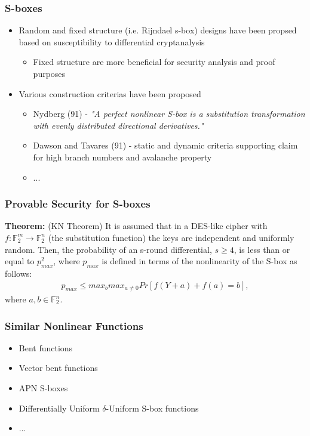 \documentclass[handout]{beamer}
\newcommand{\field}[1]{\mathbb{#1}} %
\begin{document}
\begin{frame}
	\frametitle{S-boxes}
	\begin{itemize}
		\item Random and fixed structure (i.e. Rijndael s-box) designs have been propsed based on susceptibility to differential cryptanalysis
		\begin{itemize}
			\item Fixed structure are more beneficial for security analysis and proof purposes
		\end{itemize}
		\item Various construction criterias have been proposed
		\begin{itemize}
			\item Nydberg (91) - \emph{"A perfect nonlinear S-box is a substitution transformation with evenly distributed directional derivatives."}
			\item Dawson and Tavares (91) - static and dynamic criteria supporting claim for high branch numbers and avalanche property
			\item ...
		\end{itemize}
	\end{itemize}
\end{frame}

\begin{frame}
	\frametitle{Provable Security for S-boxes}
	\textbf{Theorem: } (KN Theorem) It is assumed that in a DES-like cipher with $f :  \field{F}_2^m \to  \field{F}_2^n$ (the substitution function) the keys are independent and uniformly random. Then, the probability of an s-round differential, $s \geq 4$, is less than or equal to $p_{max}^2$, where $p_{max}$ is defined in terms of the nonlinearity of the S-box as follows:
	\begin{eqnarray*}
		p_{max} \leq max_{b} max_{a \not= 0} Pr[f(Y + a) + f(a) = b],
	\end{eqnarray*}
	where $a, b \in \field{F}_2^n$.
\end{frame}

\begin{frame}
	\frametitle{Similar Nonlinear Functions}
	\begin{itemize}
		\item Bent functions
		\item Vector bent functions
		\item APN S-boxes
		\item Differentially Uniform $\delta$-Uniform S-box functions
		\item ...
	\end{itemize}
\end{frame}
\end{document}
